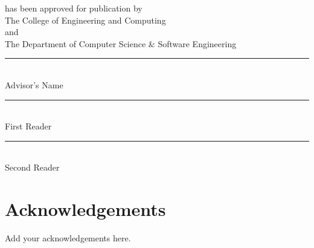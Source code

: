 \documentclass[12pt, oneside]{book2}
\begin{document}
\begin{titlepage}
\begin{center}
    has been approved for publication by\\
    \vspace{0.75cm}
    The College of Engineering and Computing\\
    \vspace{0.5cm}
    and\\
    \vspace{0.5cm}
    The Department of Computer Science \& Software Engineering\\

    \vspace{1.5cm}

    \rule[-0.1cm]{8cm}{0.01cm} \\
    Advisor's Name \\

    \vspace{1.0cm}

    \rule[-0.1cm]{8cm}{0.01cm} \\
    First Reader \\

    \vspace{1.0cm}

    \rule[-0.1cm]{8cm}{0.01cm} \\
    Second Reader \\

\end{center}
\thispagestyle{empty}
\end{titlepage}

\singlespacing
\setcounter{page}{3}

\tableofcontents
\setcounter{tocdepth}{2}
\cleardoublepage

\listoftables
\cleardoublepage

\listoffigures

\newpage

\chapter{Acknowledgements}

\noindent
Add your acknowledgements here.

\mainmatter










\appendix


\backmatter



\end{document}
